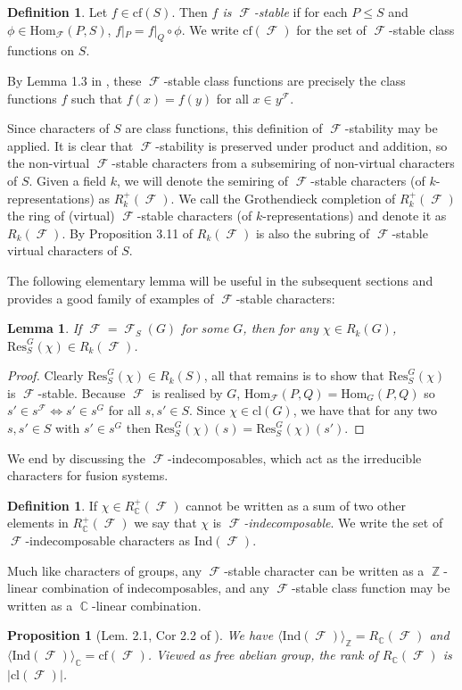 \documentclass[12pt]{article}
\DeclareMathOperator{\C}{\mathbb{C}}
\DeclareMathOperator{\Z}{\mathbb{Z}}
\DeclareMathOperator{\sF}{\mathcal{F}}
\theoremstyle{plain}
\newtheorem{prop}[thm]{Proposition}
\newtheorem{lem}[thm]{Lemma}
\theoremstyle{definition}
\newtheorem{defn}[thm]{Definition}
\begin{document}
\begin{defn} 
Let $f \in \text{cf}(S)$. Then \emph{$f$ is $\sF$-stable} if for each $P \leq S$ and $\phi \in \mathrm{Hom}_{\sF}(P, S)$, $f|_P = f|_Q \circ \phi$. We write $\text{cf}(\sF)$ for the set of $\sF$-stable class functions on $S$.
\end{defn}

By Lemma 1.3 in \cite{unique factorisation}, these $\sF$-stable class functions are precisely the class functions $f$ such that $f(x) = f(y)$ for all $x \in y^{\sF}$.

Since characters of $S$ are class functions, this definition of $\sF$-stability may be applied. It is clear that $\sF$-stability is preserved under product and addition, so the non-virtual $\sF$-stable characters from a subsemiring of non-virtual characters of $S$.
Given a field $k$, we will denote the semiring of $\sF$-stable characters (of $k$-representations) as $R_k^+(\sF)$.
We call the Grothendieck completion of $R_k^+(\sF)$ the ring of (virtual) $\sF$-stable characters (of $k$-representations) and denote it as $R_k(\sF)$. By Proposition 3.11 of \cite{aycin thesis} $R_{k}(\sF)$ is also the subring of $\sF$-stable virtual characters of $S$.

The following elementary lemma will be useful in the subsequent sections and provides a good family of examples of $\sF$-stable characters:
\begin{lem}\label{restriction}
If $\sF = \sF_S(G)$ for some $G$, then for any $\chi \in R_{k}(G)$, $\mathrm{Res}^G_S(\chi) \in R_{k}(\sF)$.
\end{lem}
\begin{proof}
Clearly $\text{Res}^G_S(\chi) \in R_{k}(S)$, all that remains is to show that $\mathrm{Res}^G_S(\chi)$ is $\sF$-stable. Because $\sF$ is realised by $G$, $\mathrm{Hom}_{\sF}(P,Q) = \mathrm{Hom}_{G}(P,Q)$ so $s' \in s^{\sF} \iff s' \in s^G$ for all $s, s' \in S$. Since $\chi \in \text{cl}(G)$, we have that for any two $s, s' \in S$ with $s' \in s^G$ then $\mathrm{Res}^G_S(\chi)(s) = \mathrm{Res}^G_S(\chi)(s')$.
\end{proof}
We end by discussing the $\sF$-indecomposables, which act as the irreducible characters for fusion systems.
\begin{defn}\label{ind def}
If $\chi \in R_{\C}^+(\sF)$ cannot be written as a sum of two other elements in $R_{\C}^+(\sF)$ we say that $\chi$ is \emph{$\sF$-indecomposable}. We write the set of $\sF$-indecomposable characters as $\text{Ind}(\sF)$.
\end{defn}
Much like characters of groups, any $\sF$-stable character can be written as a $\Z$-linear combination of indecomposables, and any $\sF$-stable class function may be written as a $\C$-linear combination.
\begin{prop}[Lem. 2.1, Cor 2.2 of \cite{completion theorem}] \label{the rank theorem}
 We have $\langle \text{Ind}(\sF) \rangle_{\Z} = R_{\C}(\sF)$ and $\langle \text{Ind}(\sF) \rangle_{\C} = \text{cf}(\sF)$. Viewed as free abelian group, the rank of $R_{\C}(\sF)$  is $|\text{cl}(\sF)|$. 
\end{prop}
\end{document}
